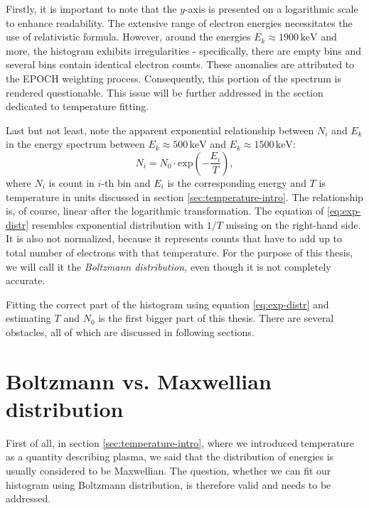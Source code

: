 Firstly, it is important to note that the $y$-axis is presented on a logarithmic scale to enhance readability. The extensive range of electron energies necessitates the use of relativistic formula. However, around the energies $E_k \approx 1900 \, \mathrm{keV}$ and more, the histogram exhibits irregularities - specifically, there are empty bins and several bins contain identical electron counts. These anomalies are attributed to the EPOCH weighting process. Consequently, this portion of the spectrum is rendered questionable. This issue will be further addressed in the section dedicated to temperature fitting.

Last but not least, note the apparent exponential relationship between $N_i$ and $E_k$ in the energy spectrum between $E_k \approx 500 \, \mathrm{keV}$ and $E_k \approx 1500 \, \mathrm{keV}$:
\begin{equation}
	\label{eq:exp-distr}
	N_i = N_0 \cdot \mathrm{exp}\left( -\frac{E_i}{T}\right)\mathrm{,}
\end{equation}
where $N_i$ is count in $i$-th bin and $E_i$ is the corresponding energy and $T$ is temperature in units discussed in section \ref{sec:temperature-intro}. The relationship is, of course, linear after the logarithmic transformation. The equation of \ref{eq:exp-distr} resembles exponential distribution with $1/T$ missing on the right-hand side. It is also not normalized, because it represents counts that have to add up to total number of electrons with that temperature. For the purpose of this thesis, we will call it the \textit{Boltzmann distribution}, even though it is not completely accurate.

Fitting the correct part of the histogram using equation \ref{eq:exp-distr} and estimating $T$ and $N_0$ is the first bigger part of this thesis. There are several obstacles, all of which are discussed in following sections.

\section{Boltzmann vs. Maxwellian distribution}
First of all, in section \ref{sec:temperature-intro}, where we introduced temperature as a quantity describing plasma, we said that the distribution of energies is usually considered to be Maxwellian. The question, whether we can fit our histogram using Boltzmann distribution, is therefore valid and needs to be addressed.

